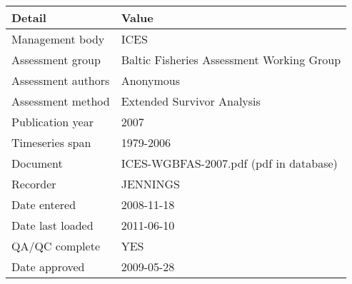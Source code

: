 \begin{table}[htb]
\centering
\begin{tabular}{lp{7cm}}
\toprule
Detail & Value \\
\midrule
Management body    & ICES                                      \\
Assessment group   & Baltic Fisheries Assessment Working Group \\
Assessment authors & Anonymous                                 \\
Assessment method  & Extended Survivor Analysis                \\
Publication year   & 2007                                      \\
Timeseries span    & 1979-2006                                 \\
Document           & ICES-WGBFAS-2007.pdf (pdf in database)    \\
Recorder           & JENNINGS                                  \\
Date entered       & 2008-11-18                                \\
Date last loaded   & 2011-06-10                                \\
QA/QC complete     & YES                                       \\
Date approved      & 2009-05-28                                \\
\bottomrule
\end{tabular}
\label{tab:assessdet}
\end{table}
